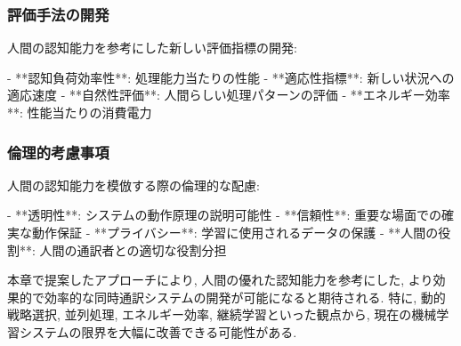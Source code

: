 \subsubsection{評価手法の開発}

人間の認知能力を参考にした新しい評価指標の開発:

- **認知負荷効率性**: 処理能力当たりの性能
- **適応性指標**: 新しい状況への適応速度
- **自然性評価**: 人間らしい処理パターンの評価
- **エネルギー効率**: 性能当たりの消費電力

\subsubsection{倫理的考慮事項}

人間の認知能力を模倣する際の倫理的な配慮:

- **透明性**: システムの動作原理の説明可能性
- **信頼性**: 重要な場面での確実な動作保証
- **プライバシー**: 学習に使用されるデータの保護
- **人間の役割**: 人間の通訳者との適切な役割分担

本章で提案したアプローチにより, 人間の優れた認知能力を参考にした, より効果的で効率的な同時通訳システムの開発が可能になると期待される.
特に, 動的戦略選択, 並列処理, エネルギー効率, 継続学習といった観点から, 現在の機械学習システムの限界を大幅に改善できる可能性がある.